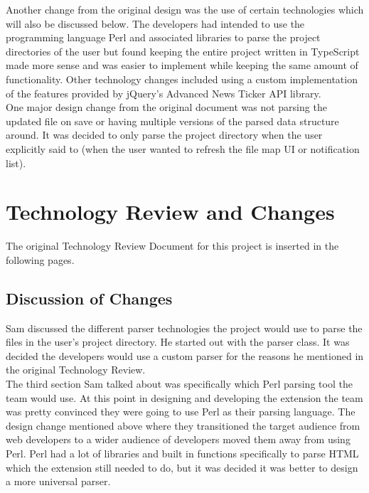 \documentclass[letterpaper,10pt,titlepage,draftclsnofoot,onecolumn,onesided] {IEEEtran}
\begin{document}
Another change from the original design was the use of certain technologies which will also be discussed below.
The developers had intended to use the programming language Perl and associated libraries to parse the project directories of the user but found keeping the entire project written in TypeScript made more sense and was easier to implement while keeping the same amount of functionality. 
Other technology changes included using a custom implementation of the features provided by jQuery's Advanced News Ticker API library.\\

One major design change from the original document was not parsing the updated file on save or having multiple versions of the parsed data structure around.
It was decided to only parse the project directory when the user explicitly said to (when the user wanted to refresh the file map UI or notification list). \\

\section{Technology Review and Changes}
The original Technology Review Document for this project is inserted in the following pages.

\subsection{Discussion of Changes}
Sam discussed the different parser technologies the project would use to parse the files in the user's project directory.
He started out with the parser class.
It was decided the developers would use a custom parser for the reasons he mentioned in the original Technology Review. \\

The third section Sam talked about was specifically which Perl parsing tool the team would use.
At this point in designing and developing the extension the team was pretty convinced they were going to use Perl as their parsing language.
The design change mentioned above where they transitioned the target audience from web developers to a wider audience of developers moved them away from using Perl.
Perl had a lot of libraries and built in functions specifically to parse HTML which the extension still needed to do, but it was decided it was better to design a more universal parser.\\
\end{document}
